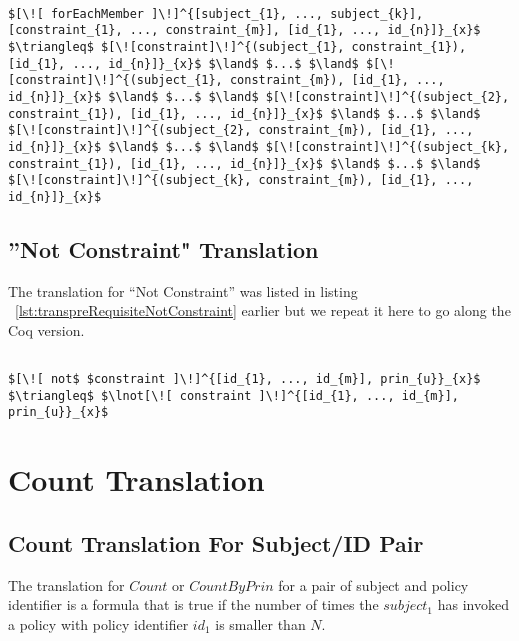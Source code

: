 \lstset{mathescape, language=AST}  
\begin{lstlisting}[frame=single, caption={ForEachMember Translation {$\colon$} Count by Principal},label={lst:transforEachMember}]

$[\![ forEachMember ]\!]^{[subject_{1}, ..., subject_{k}], [constraint_{1}, ..., constraint_{m}], [id_{1}, ..., id_{n}]}_{x}$ $\triangleq$ $[\![constraint]\!]^{(subject_{1}, constraint_{1}), [id_{1}, ..., id_{n}]}_{x}$ $\land$ $...$ $\land$ $[\![constraint]\!]^{(subject_{1}, constraint_{m}), [id_{1}, ..., id_{n}]}_{x}$ $\land$ $...$ $\land$ $[\![constraint]\!]^{(subject_{2}, constraint_{1}), [id_{1}, ..., id_{n}]}_{x}$ $\land$ $...$ $\land$ $[\![constraint]\!]^{(subject_{2}, constraint_{m}), [id_{1}, ..., id_{n}]}_{x}$ $\land$ $...$ $\land$ $[\![constraint]\!]^{(subject_{k}, constraint_{1}), [id_{1}, ..., id_{n}]}_{x}$ $\land$ $...$ $\land$ $[\![constraint]\!]^{(subject_{k}, constraint_{m}), [id_{1}, ..., id_{n}]}_{x}$ 

\end{lstlisting}

\subsection{''Not Constraint" Translation}

The translation for ``Not Constraint'' was listed in listing ~\ref{lst:transpreRequisiteNotConstraint} earlier but we repeat it here to go along the Coq version. 

\lstset{mathescape, language=AST}  
\begin{lstlisting}[frame=single, caption={Not Constraint Translation},label={lst:transnotCons}]

$[\![ not$ $constraint ]\!]^{[id_{1}, ..., id_{m}], prin_{u}}_{x}$ $\triangleq$ $\lnot[\![ constraint ]\!]^{[id_{1}, ..., id_{m}], prin_{u}}_{x}$ 

\end{lstlisting}

\section{Count Translation}
\subsection{Count Translation For Subject/ID Pair}
The translation for $Count$ or $CountByPrin$ for a pair of subject and policy identifier is a formula that is true if the number of times the $subject_{1}$ has invoked a policy with policy identifier $id_{1}$ is smaller than $N$.

